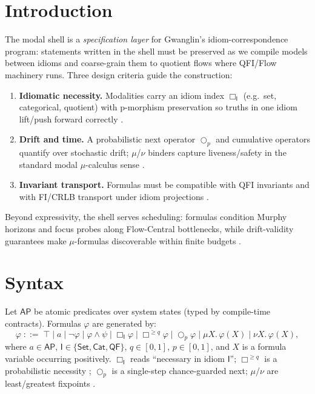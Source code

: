 \documentclass[11pt]{article}
\theoremstyle{plain}
\theoremstyle{definition}
\theoremstyle{remark}
\newcommand{\1}{\mathbbm{1}}
\begin{document}
\section{Introduction}
The modal shell is a \emph{specification layer} for Gwanglin’s idiom-correspondence program: statements written in the shell must be preserved as we compile models between idioms and coarse-grain them to quotient flows where QFI/Flow machinery runs. Three design criteria guide the construction:
\begin{enumerate}
  \item \textbf{Idiomatic necessity.} Modalities carry an idiom index $\Box_{\mathsf{I}}$ (e.g.\ set, categorical, quotient) with p-morphism preservation so truths in one idiom lift/push forward correctly \parencite[Ch.\ 2--3]{BlackburnRijkeVenema2001}.
  \item \textbf{Drift and time.} A probabilistic next operator $\bigcirc_{p}$ and cumulative operators quantify over stochastic drift; $\mu$/$\nu$ binders capture liveness/safety in the standard modal $\mu$-calculus sense \parencite{Kozen1983,Stirling2001}.
  \item \textbf{Invariant transport.} Formulas must be compatible with QFI invariants and with FI/CRLB transport under idiom projections \parencite{elliott2025qfi,elliott2025idiom}.
\end{enumerate}
Beyond expressivity, the shell serves scheduling: formulas condition Murphy horizons and focus probes along Flow-Central bottlenecks, while drift-validity guarantees make $\mu$-formulas discoverable within finite budgets \parencite{elliott2025flow,elliott2025drift,elliott2025pmb}.

\section{Syntax}\label{sec:syntax}
Let $\mathsf{AP}$ be atomic predicates over system states (typed by compile-time contracts). Formulas $\varphi$ are generated by:
\[
\varphi \;::=\; \top \mid a \mid \neg \varphi \mid \varphi \land \psi \mid \Box_{\mathsf{I}} \varphi \mid \Box^{\ge q} \varphi \mid \bigcirc_{p}\varphi \mid \mu X.\,\varphi(X) \mid \nu X.\,\varphi(X),
\]
where $a\in\mathsf{AP}$, $\mathsf{I}\in\{\mathsf{Set},\mathsf{Cat},\mathsf{QF}\}$, $q\in[0,1]$, $p\in[0,1]$, and $X$ is a formula variable occurring positively. $\Box_{\mathsf{I}}$ reads ``necessary in idiom $\mathsf{I}$''; $\Box^{\ge q}$ is a probabilistic necessity \parencite[Ch.\ 8]{BlackburnRijkeVenema2001}; $\bigcirc_{p}$ is a single-step chance-guarded next; $\mu$/$\nu$ are least/greatest fixpoints \parencite{Kozen1983}.
\end{document}
